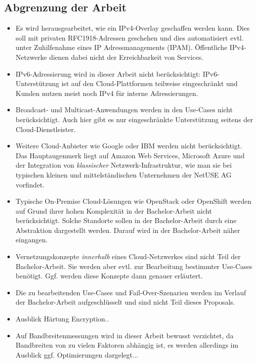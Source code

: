 \subsection{Abgrenzung der Arbeit}

\begin{itemize}
\item Es wird herausgearbeitet, wie ein IPv4-Overlay geschaffen werden kann. Dies soll mit privaten RFC1918-Adressen geschehen und dies automatisiert evtl. unter Zuhilfenahme eines IP Adressmanagements (IPAM). Öffentliche IPv4-Netzwerke dienen dabei nicht der Erreichbarkeit von Services.
\item IPv6-Adressierung wird in dieser Arbeit nicht berücksichtigt: IPv6-Unterstützung ist auf den Cloud-Plattformen teilweise eingeschränkt und Kunden nutzen meist noch IPv4 für interne Adressierungen.
\item Broadcast- und Multicast-Anwendungen werden in den Use-Cases nicht berücksichtigt. Auch hier gibt es nur eingeschränkte Unterstützung seitens der Cloud-Dienstleister.
\item Weitere Cloud-Anbieter wie Google oder IBM werden nicht berücksichtigt. Das Hauptaugenmerk liegt auf Amazon Web Services, Microsoft Azure und der Integration von \textit{klassischer} Netzwerk-Infrastruktur, wie man sie bei typischen kleinen und mittelständischen Unternehmen der NetUSE AG vorfindet.
\item Typische On-Premise Cloud-Lösungen wie OpenStack oder OpenShift werden auf Grund ihrer hohen Komplexität in der Bachelor-Arbeit nicht berücksichtigt. Solche Standorte sollen in der Bachelor-Arbeit durch eine Abstraktion dargestellt werden. Darauf wird in der Bachelor-Arbeit näher eingangen.
\item Vernetzungskonzepte \textit{innerhalb} eines Cloud-Netzwerkes sind nicht Teil der Bachelor-Arbeit. Sie werden aber evtl. zur Bearbeitung bestimmter Use-Cases benötigt. Ggf. werden diese Konzepte dann genauer erläutert.
\item Die zu bearbeitenden Use-Cases und Fail-Over-Szenarien werden im Verlauf der Bachelor-Arbeit aufgeschlüsselt und sind nicht Teil dieses Proposals.
\item Ausblick Härtung Encryption..
\item Auf Bandbreitenmessungen wird in dieser Arbeit bewusst verzichtet, da Bandbreiten von zu vielen Faktoren abhängig ist, es werden allerdings im Ausblick ggf. Optimierungen dargelegt...

\end{itemize}
